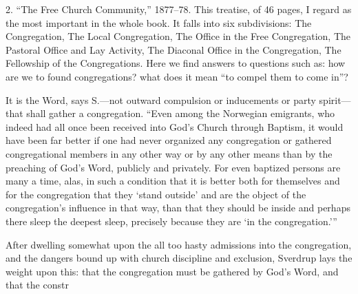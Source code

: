 2. “The Free Church Community,” 1877–78. This treatise, of 46 pages, I regard as the most important in the whole book. It falls into six subdivisions: The Congregation, The Local Congregation, The Office in the Free Congregation, The Pastoral Office and Lay Activity, The Diaconal Office in the Congregation, The Fellowship of the Congregations. Here we find answers to questions such as: how are we to found congregations? what does it mean “to compel them to come in”?

It is the Word, says S.—not outward compulsion or inducements or party spirit—that shall gather a congregation. “Even among the Norwegian emigrants, who indeed had all once been received into God’s Church through Baptism, it would have been far better if one had never organized any congregation or gathered congregational members in any other way or by any other means than by the preaching of God’s Word, publicly and privately. For even baptized persons are many a time, alas, in such a condition that it is better both for themselves and for the congregation that they ‘stand outside’ and are the object of the congregation’s influence in that way, than that they should be inside and perhaps there sleep the deepest sleep, precisely because they are ‘in the congregation.’”

After dwelling somewhat upon the all too hasty admissions into the congregation, and the dangers bound up with church discipline and exclusion, Sverdrup lays the weight upon this: that the congregation must be gathered by God’s Word, and that the constr